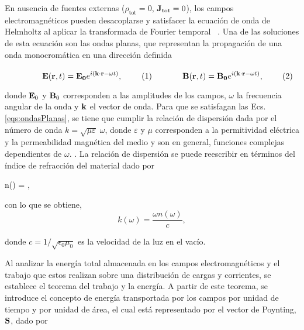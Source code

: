 En ausencia de fuentes externas (\( \rho_{\text{tot}} = 0 \), \( \vb{J}_{\text{tot}} = 0 \)), los campos electromagnéticos pueden desacoplarse y satisfacer la ecuación de onda de Helmholtz al aplicar la transformada de Fourier temporal ~\cite{jacksonClassicalElectrodynamics2021}. Una de las soluciones de esta ecuación son las ondas planas, que representan la propagación de una onda monocromática en una dirección definida

	\begin{subequations}%
	\eqhalf{\vb{E}(\vb{r},t) =\vb{E_0}e^{i(\vb{k}\cdot\vb{r} -\omega t)},}\label{seq:E_plana}%
	\eqhalf{\vb{B}(\vb{r}, t) =\vb{B_0}e^{i(\vb{k}\cdot\vb{r} -\omega t)},}	\label{seq:B_plana}
	\label{eqs:ondasPlanas}\end{subequations}\vspace*{-1em}
		
\noindent donde $\vb{E}_0$ y $\vb{B}_0$ corresponden a las amplitudes de los campos, $\omega$ la frecuencia angular de la onda y $\vb{k}$ el vector de onda. Para que se satisfagan las Ecs. \eqref{eqs:ondasPlanas}, se tiene que cumplir la relación de dispersión dada por el número de onda $k=\sqrt{\mu\varepsilon}\;\omega$, donde $\varepsilon$ y $\mu$ corresponden a la permitividad eléctrica y la permeabilidad magnética del medio y son en general, funciones complejas dependientes de $\omega$. \cite{jacksonClassicalElectrodynamics2021}. La relación de dispersión se puede reescribir en términos del índice de refracción del material dado por
%
\begin{tcolorbox}
	n(\omega) = ,
	\label{eq:indice} 
\end{tcolorbox}
%	
\noindent con lo que se obtiene,
%
\begin{equation}
	k(\omega) =\dfrac{\omega n(\omega)}{c},
	\label{eq:numero_onda} 
\end{equation}

\noindent donde $c=1/\sqrt{\epsilon_0\mu_0}$ es la velocidad de la luz en el vacío.

Al analizar la energía total almacenada en los campos electromagnéticos y el trabajo que estos realizan sobre una distribución de cargas y corrientes, se establece el teorema del trabajo y la energía. A partir de este teorema, se introduce el concepto de energía transportada por los campos por unidad de tiempo y por unidad de área, el cual está representado por el vector de Poynting, $\vb{S}$, dado por \cite{griffithsIntroductionElectrodynamics2023}

